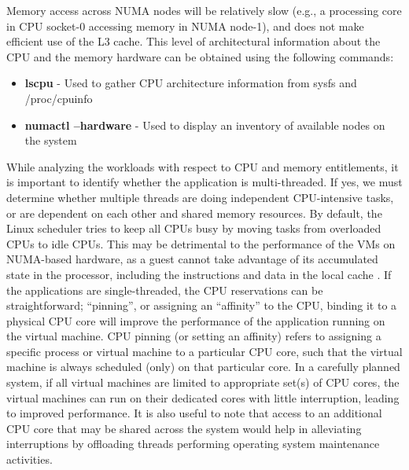 Memory access across NUMA nodes will be relatively slow (e.g., a processing core in CPU socket-0 accessing memory in NUMA node-1), and does not make efficient use of the L3 cache. This level of architectural information about the CPU and the memory hardware can be obtained using the following commands: \\
\begin{itemize}
\item \textbf{lscpu} \cite{lscpu} - Used to gather CPU architecture information from sysfs and /proc/cpuinfo
\item \textbf{numactl --hardware }\cite{numactl} - Used to display an inventory of available nodes on the system
\end{itemize}


While analyzing the workloads with respect to CPU and memory entitlements, it is important to identify whether the application is multi-threaded. If yes, we must determine whether multiple threads are doing independent CPU-intensive tasks, or are dependent on each other and shared memory resources. By default, the Linux scheduler tries to keep all CPUs busy by moving tasks from overloaded CPUs to idle CPUs. This may be detrimental to the performance of the VMs on NUMA-based hardware, as a guest cannot take advantage of its accumulated state in the processor, including the instructions and data in the local cache \cite{procaffinity}. If the applications are single-threaded, the CPU reservations can be straightforward; ``pinning'', or assigning an ``affinity'' to the CPU, binding it to a physical CPU core will improve the performance of the application running on the virtual machine. CPU pinning (or setting an affinity) refers to assigning a specific process or virtual machine to a particular CPU core, such that the virtual machine is always scheduled (only) on that particular core. In a carefully planned system, if all virtual machines are limited to appropriate set(s) of CPU cores, the virtual machines can run on their dedicated cores with little interruption, leading to improved performance. It is also useful to note that access to an additional CPU core that may be shared across the system would help in alleviating interruptions by offloading threads performing operating system maintenance activities.

